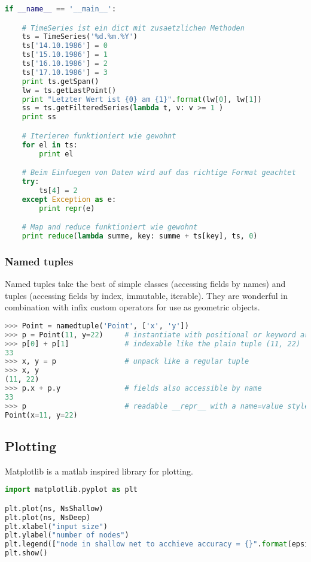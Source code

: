 \begin{lstlisting}[language=python]
if __name__ == '__main__':

    # TimeSeries ist ein dict mit zusaetzlichen Methoden
    ts = TimeSeries('%d.%m.%Y')
    ts['14.10.1986'] = 0
    ts['15.10.1986'] = 1
    ts['16.10.1986'] = 2
    ts['17.10.1986'] = 3
    print ts.getSpan()
    lw = ts.getLastPoint()
    print "Letzter Wert ist {0} am {1}".format(lw[0], lw[1])
    ss = ts.getFilteredSeries(lambda t, v: v >= 1 )
    print ss

    # Iterieren funktioniert wie gewohnt
    for el in ts:
        print el

    # Beim Einfuegen von Daten wird auf das richtige Format geachtet
    try:
        ts[4] = 2
    except Exception as e:
        print repr(e)

    # Map and reduce funktioniert wie gewohnt
    print reduce(lambda summe, key: summe + ts[key], ts, 0)

\end{lstlisting}


\subsubsection{Named tuples}
Named tuples take the best of simple classes (accessing fields by names) and tuples (accessing fields by index, immutable, iterable). They are wonderful in combination with infix custom operators for use as geometric objects.

\begin{lstlisting}[language=python]
>>> Point = namedtuple('Point', ['x', 'y'])
>>> p = Point(11, y=22)     # instantiate with positional or keyword arguments
>>> p[0] + p[1]             # indexable like the plain tuple (11, 22)
33
>>> x, y = p                # unpack like a regular tuple
>>> x, y
(11, 22)
>>> p.x + p.y               # fields also accessible by name
33
>>> p                       # readable __repr__ with a name=value style
Point(x=11, y=22)
\end{lstlisting}


\subsection{Plotting}

Matplotlib is a matlab inspired library for plotting. 

\begin{lstlisting}[language=python]
import matplotlib.pyplot as plt

plt.plot(ns, NsShallow)
plt.plot(ns, NsDeep)
plt.xlabel("input size")
plt.ylabel("number of nodes")
plt.legend(["node in shallow net to acchieve accuracy = {}".format(epsilon), "node in deep net to acchieve accuracy = {}".format(epsilon) ], loc="upper left")
plt.show()
\end{lstlisting}

